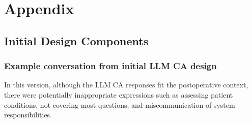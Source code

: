 \clearpage
\onecolumn
\section{Appendix}
\label{sec:appendix}
\subsection{Initial Design Components}
\subsubsection{Example conversation from initial LLM CA design}
In this version, although the LLM CA responses fit the postoperative context, there were potentially inappropriate expressions such as assessing patient conditions, not covering most questions, and miscommunication of system responsibilities.


